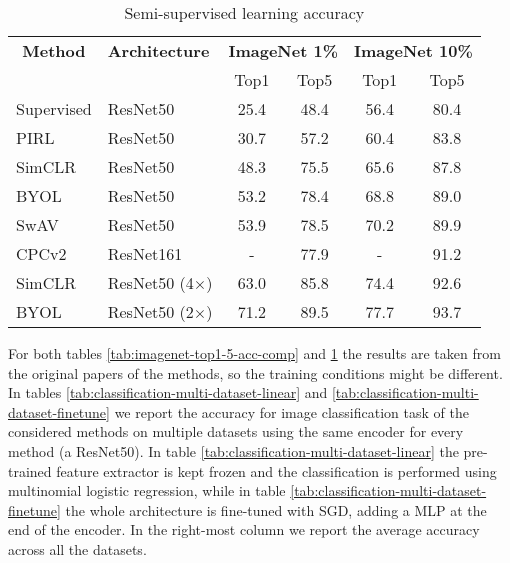 \begin{table}[H]
	\centering
	\begin{tabular}{|l|l|cc|cc|}
		\hline
		\multicolumn{1}{|c|}{\textbf{Method}} & \textbf{Architecture} & \multicolumn{2}{c|}{\textbf{ImageNet 1\%}} & \multicolumn{2}{c|}{\textbf{ImageNet 10\%}} \\
		\multicolumn{1}{|c|}{} &  & Top1 & Top5 & Top1 & Top5  \\
		\hline
		Supervised & ResNet50 & 25.4 & 48.4 & 56.4 & 80.4 \\
		PIRL & ResNet50 & 30.7 & 57.2  & 60.4 & 83.8 \\
		SimCLR & ResNet50 & 48.3 & 75.5  & 65.6 & 87.8 \\
		BYOL & ResNet50  & 53.2 & 78.4  & 68.8 & 89.0 \\ 
		SwAV & ResNet50 & 53.9 & 78.5  & 70.2 & 89.9 \\
		CPCv2 & ResNet161 & - & 77.9 & - & 91.2 \\
		SimCLR & ResNet50 (4$\times$) & 63.0 & 85.8 & 74.4 & 92.6 \\
		BYOL & ResNet50 (2$\times$) & 71.2 & 89.5 & 77.7 & 93.7 \\
		\hline
	\end{tabular}
	\caption{Semi-supervised learning accuracy}
	\label{tab:imagenet-1-perc-semisup}
\end{table}
\noindent For both tables \ref{tab:imagenet-top1-5-acc-comp} and \ref{tab:imagenet-1-perc-semisup} the results are taken from the original papers of the methods, so the training conditions might be different.\\
In tables \ref{tab:classification-multi-dataset-linear} and \ref{tab:classification-multi-dataset-finetune} we report the accuracy for image classification task of the considered methods on multiple datasets using the same encoder for every method (a ResNet50). In table \ref{tab:classification-multi-dataset-linear} the pre-trained feature extractor is kept frozen and the classification is performed using multinomial logistic regression, while in table \ref{tab:classification-multi-dataset-finetune} the whole architecture is fine-tuned with SGD, adding a MLP at the end of the encoder. In the right-most column we report the average accuracy across all the datasets. 
